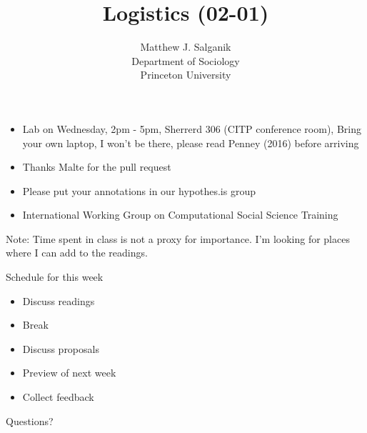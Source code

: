 \documentclass[aspectratio=169]{beamer}
\title[]{Logistics (02-01)}
\author[]{Matthew J. Salganik\\Department of Sociology\\Princeton University}
\date[]{Soc 596: Computational Social Science
\vfill
\begin{flushright}
\vspace{0.6in}
\texttt{[image: figures/cc.png]}
\end{flushright}
}
\def\vf{\vfill}
\begin{document}
\frame{\titlepage}
\begin{frame}

\begin{itemize}
\item Lab on Wednesday, 2pm - 5pm, Sherrerd 306 (CITP conference room), Bring your own laptop, I won't be there, please read Penney (2016) before arriving
\pause
\item Thanks Malte for the pull request
\pause
\item Please put your annotations in our hypothes.is group
\pause
\item International Working Group on Computational Social Science Training
\end{itemize}

\end{frame}
\begin{frame}

Note: Time spent in class is not a proxy for importance. I'm looking for places where I can add to the readings.

\end{frame}
\begin{frame}

Schedule for this week
\begin{itemize}
\item Discuss readings
\item Break
\item Discuss proposals
\item Preview of next week
\item Collect feedback
\end{itemize}

\vf
Questions?

\end{frame}
\end{document}
